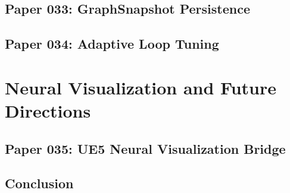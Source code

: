 \documentclass[12pt,a4paper]{article}
\begin{document}
\chapter*{Paper 033: GraphSnapshot Persistence}


\chapter*{Paper 034: Adaptive Loop Tuning}


\part{Neural Visualization and Future Directions}

\chapter*{Paper 035: UE5 Neural Visualization Bridge}


\chapter*{Conclusion}




\end{document}
